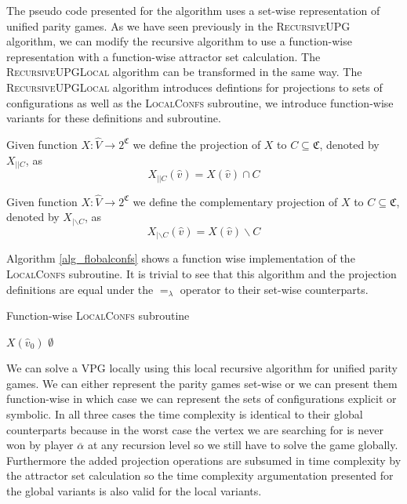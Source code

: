 The pseudo code presented for the algorithm uses a set-wise representation of unified parity games. As we have seen previously in the \textsc{RecursiveUPG} algorithm, we can modify the recursive algorithm to use a function-wise representation with a function-wise attractor set calculation. The \textsc{RecursiveUPGLocal} algorithm can be transformed in the same way. The \textsc{RecursiveUPGLocal} algorithm introduces defintions for projections to sets of configurations as well as the \textsc{LocalConfs} subroutine, we introduce function-wise variants for these definitions and subroutine.
\begin{definition}
	Given function $X : \hat{V} \rightarrow 2^\mathfrak{C}$ we define the projection of $X$ to $C \subseteq \mathfrak{C}$, denoted by $X_{||C}$, as
	\[ X_{||C}(\hat{v}) = X(\hat{v}) \cap C \]
\end{definition}
\begin{definition}
	Given function $X : \hat{V} \rightarrow 2^\mathfrak{C}$ we define the complementary projection of $X$ to $C \subseteq \mathfrak{C}$, denoted by $X_{|\backslash C}$, as
	\[ X_{|\backslash C}(\hat{v}) = X(\hat{v}) \backslash C \]
\end{definition}
Algorithm \ref{alg_flobalconfs} shows a function wise implementation of the \textsc{LocalConfs} subroutine. It is trivial to see that this algorithm and the projection definitions are equal under the $=_\lambda$ operator to their set-wise counterparts.
\begin{algorithm}
	\caption{Function-wise \textsc{LocalConfs} subroutine}
	\label{alg_flobalconfs}
	\begin{algorithmic}[1]
		\If{$\overline{\alpha} \in \Delta$}
		\State \Return $X(\hat{v}_0)$
		\Else
		\State \Return $\emptyset$
		\EndIf
		\EndFunction
	\end{algorithmic}
\end{algorithm}

We can solve a VPG locally using this local recursive algorithm for unified parity games. We can either represent the parity games set-wise or we can present them function-wise in which case we can represent the sets of configurations explicit or symbolic. In all three cases the time complexity is identical to their global counterparts because in the worst case the vertex we are searching for is never won by player $\overline{\alpha}$ at any recursion level so we still have to solve the game globally. Furthermore the added projection operations are subsumed in time complexity by the attractor set calculation so the time complexity argumentation presented for the global variants is also valid for the local variants. 